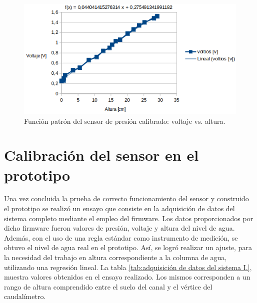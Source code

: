 \begin{figure}[H]
	\centering
	\includegraphics[scale=.75]{./Figures/FuncionPatron-Sensor-VoltajeVsAltura.png}
	\caption{Función patrón del sensor de presión calibrado: voltaje vs. altura.}
	\label{fig:Función patrón del sensor de presión calibrado: voltaje vs. altura}
	\end{figure}
	
\section{Calibración del sensor en el prototipo
}
\label{sec:Calibración del sensor en el prototipo}
Una vez concluida la prueba de correcto funcionamiento del sensor y construido el prototipo se realizó un ensayo que consiste en la adquisición de datos del sistema completo mediante el empleo del firmware. Los datos proporcionados por dicho firmware fueron valores de presión, voltaje y altura del nivel de agua. Además, con el uso de una regla estándar como instrumento de medición, se obtuvo el nivel de agua real en el prototipo. Así, se logró realizar un ajuste, para la necesidad del trabajo en altura correspondiente a la columna de agua, utilizando una regresión lineal. La tabla \ref{tab:adquisición de datos del sistema I.}, muestra valores obtenidos en el ensayo realizado. Los mismos corresponden a un rango de altura comprendido entre el suelo del canal y el vértice del caudalímetro.

